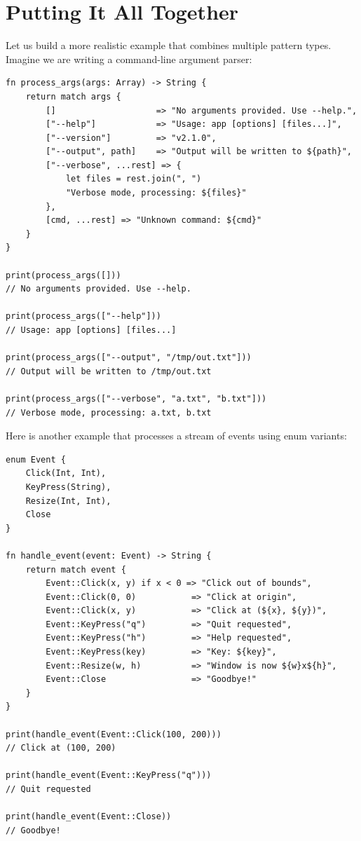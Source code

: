 \section{Putting It All Together}\label{sec:match-examples}

Let us build a more realistic example that combines multiple pattern types. Imagine we are writing a command-line argument parser:

\begin{lstlisting}[language=Lattice, caption={A command-line argument processor}]
fn process_args(args: Array) -> String {
    return match args {
        []                    => "No arguments provided. Use --help.",
        ["--help"]            => "Usage: app [options] [files...]",
        ["--version"]         => "v2.1.0",
        ["--output", path]    => "Output will be written to ${path}",
        ["--verbose", ...rest] => {
            let files = rest.join(", ")
            "Verbose mode, processing: ${files}"
        },
        [cmd, ...rest] => "Unknown command: ${cmd}"
    }
}

print(process_args([]))
// No arguments provided. Use --help.

print(process_args(["--help"]))
// Usage: app [options] [files...]

print(process_args(["--output", "/tmp/out.txt"]))
// Output will be written to /tmp/out.txt

print(process_args(["--verbose", "a.txt", "b.txt"]))
// Verbose mode, processing: a.txt, b.txt
\end{lstlisting}

Here is another example that processes a stream of events using enum variants:

\begin{lstlisting}[language=Lattice, caption={Processing events with enum matching}]
enum Event {
    Click(Int, Int),
    KeyPress(String),
    Resize(Int, Int),
    Close
}

fn handle_event(event: Event) -> String {
    return match event {
        Event::Click(x, y) if x < 0 => "Click out of bounds",
        Event::Click(0, 0)           => "Click at origin",
        Event::Click(x, y)           => "Click at (${x}, ${y})",
        Event::KeyPress("q")         => "Quit requested",
        Event::KeyPress("h")         => "Help requested",
        Event::KeyPress(key)         => "Key: ${key}",
        Event::Resize(w, h)          => "Window is now ${w}x${h}",
        Event::Close                 => "Goodbye!"
    }
}

print(handle_event(Event::Click(100, 200)))
// Click at (100, 200)

print(handle_event(Event::KeyPress("q")))
// Quit requested

print(handle_event(Event::Close))
// Goodbye!
\end{lstlisting}

